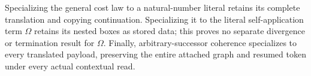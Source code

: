 

Specializing the general cost law to a natural-number literal retains its
complete translation and copying continuation. Specializing it to the literal
self-application term $\Omega$ retains its nested boxes as stored data;
this proves no separate divergence or termination result for $\Omega$.
Finally, arbitrary-successor coherence specializes to every translated payload,
preserving the entire attached graph and resumed token under every actual
contextual read.




